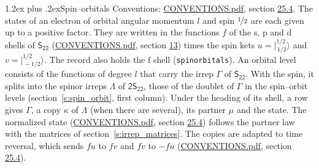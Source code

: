 \documentclass[10pt,a4paper]{article}
\makeatletter
\renewcommand\section{\@startsection{section}{1}{\z@}{-3ex plus -1ex minus -.2ex}%
  {1.2ex plus .2ex}{\normalfont\large\sffamily\bfseries\color{parttitle}}}
\numberwithin{equation}{section}
\newcommand{\grp}[1]{\mathsf{#1}}
\newcommand{\orbital}[1]{\mathrm{#1}}
\newcommand{\mult}{\kappa}
\newcommand{\intx}{\mu}
\newcommand{\jm}[2]{\bigl\lvert{}^{#1}_{\,#2}\bigr\rangle}
\makeatother
\begin{document}
\section{Spin--orbitals}\label{s:spin_orbitals}
Conventions: \href{../../CONVENTIONS.pdf}{CONVENTIONS.pdf}, section \href{../../CONVENTIONS.pdf\#conv.25.4}{25.4}.
\leavevmode\label{n:index.orbital.l}The states of an electron of orbital angular momentum $l$ and spin $\nicefrac{1}{2}$ are each given up to a positive factor. \label{n:local.spinor.uv}\label{n:local.function.f}They are written in the functions $f$ of the $\orbital{s}$, $\orbital{p}$ and $\orbital{d}$ shells of \href{../../../rotation/data/pdf/S22.pdf}{$\grp{S_{22}}$} (\href{../../CONVENTIONS.pdf}{CONVENTIONS.pdf}, section \href{../../../rotation/CONVENTIONS.pdf\#conv.13}{13}) times the spin kets $u = \jm{1/2}{1/2}$ and $v = \jm{1/2}{-1/2}$. The record also holds the $\orbital{f}$ shell (\texttt{spinorbitals}). An orbital level consists of the functions of degree $l$ that carry the irrep $\Gamma$ of \href{../../../rotation/data/pdf/S22.pdf}{$\grp{S_{22}}$}. With the spin, it splits into the spinor irreps $\Lambda$ of $\grp{2S_{22}}$, those of the doublet of $\Gamma$ in the spin--orbit levels (section~\ref{s:spin_orbit}, first column). \label{n:head.state}Under the heading of its shell, a row gives $\Gamma$, a copy $\mult$ of $\Lambda$ (when there are several), its partner $\intx$ and the state. The normalized state (\href{../../CONVENTIONS.pdf}{CONVENTIONS.pdf}, section \href{../../CONVENTIONS.pdf\#conv.25.4}{25.4}) follows the partner law with the matrices of section~\ref{s:irrep_matrices}. The copies are adapted to time reversal, which sends $f u$ to $f v$ and $f v$ to $-f u$ (\href{../../CONVENTIONS.pdf}{CONVENTIONS.pdf}, section \href{../../CONVENTIONS.pdf\#conv.25.4}{25.4}).
\end{document}
